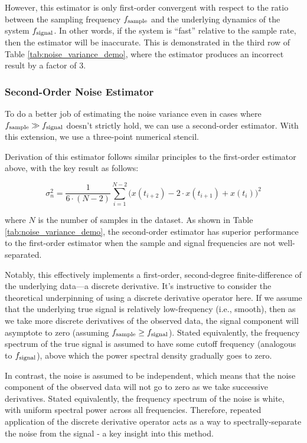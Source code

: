 However, this estimator is only first-order convergent with respect to the ratio between the sampling frequency $f_{\rm sample}$ and the underlying dynamics of the system $f_{\rm signal}$. In other words, if the system is ``fast'' relative to the sample rate, then the estimator will be inaccurate. This is demonstrated in the third row of Table \ref{tab:noise_variance_demo}, where the estimator produces an incorrect result by a factor of 3.

\subsubsection{Second-Order Noise Estimator}

To do a better job of estimating the noise variance even in cases where $f_{\rm sample} \gg f_{\rm signal}$ doesn't strictly hold, we can use a second-order estimator. With this extension, we use a three-point numerical stencil.

Derivation of this estimator follows similar principles to the first-order estimator above, with the key result as follows:

\begin{equation}
    \sigma_n^2 = \frac{1}{6 \cdot (N-2)} \sum_{i=1}^{N-2} \Big( x(t_{i+2}) - 2 \cdot x(t_{i+1}) + x(t_i) \Big)^2
    \label{eq:2nd_order_noise_estimator}
\end{equation}

\noindent where $N$ is the number of samples in the dataset. As shown in Table \ref{tab:noise_variance_demo}, the second-order estimator has superior performance to the first-order estimator when the sample and signal frequencies are not well-separated.

Notably, this effectively implements a first-order, second-degree finite-difference of the underlying data—a discrete derivative. It's instructive to consider the theoretical underpinning of using a discrete derivative operator here. If we assume that the underlying true signal is relatively low-frequency (i.e., smooth), then as we take more discrete derivatives of the observed data, the signal component will asymptote to zero (assuming $f_{\rm sample} \geq f_{\rm signal}$). Stated equivalently, the frequency spectrum of the true signal is assumed to have some cutoff frequency (analogous to $f_{\rm signal}$), above which the power spectral density gradually goes to zero.

In contrast, the noise is assumed to be independent, which means that the noise component of the observed data will not go to zero as we take successive derivatives. Stated equivalently, the frequency spectrum of the noise is white, with uniform spectral power across all frequencies. Therefore, repeated application of the discrete derivative operator acts as a way to spectrally-separate the noise from the signal - a key insight into this method.

